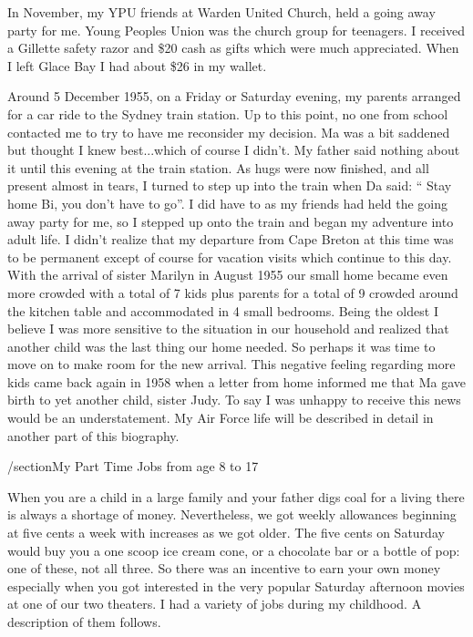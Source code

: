 In November, my YPU friends at Warden United Church, held a going away party for me. Young Peoples Union was the church group for teenagers. I received a Gillette safety razor and \$20 cash as gifts which were much appreciated. When I left Glace Bay I had about \$26 in my wallet.

Around 5 December 1955, on a Friday or Saturday evening, my parents arranged for a car ride to the Sydney train station. Up to this point, no one from school contacted me to try to have me reconsider my decision. Ma was a bit saddened but thought I knew best...which of course I didn't. My father said nothing about it until this evening at the train station. As hugs were now finished, and all present almost in tears, I turned to step up into the train when Da said: “ Stay home Bi, you don't have to go”. I did have to as my friends had held the going away party for me, so I stepped up onto the train and began my adventure into adult life. I didn't realize that my departure from Cape Breton at this time was to be permanent except of course for vacation visits which continue to this day. With the arrival of sister Marilyn in August 1955 our small home became even more crowded with a total of 7 kids plus parents for a total of 9 crowded around the kitchen table and accommodated in 4 small bedrooms. Being the oldest I believe I was more sensitive to the situation in our household and realized that another child was the last thing our home needed. So perhaps it was time to move on to make room for the new arrival. This negative feeling regarding more kids came back again in 1958 when a letter from home informed me that Ma gave birth to yet another child, sister Judy. To say I was unhappy to receive this news would be an understatement.
My Air Force life will be described in detail in another part of this biography.

/section{My Part Time Jobs from age 8 to 17}

When you are a child in a large family and your father digs coal for a living there is always a shortage of money. Nevertheless, we got weekly allowances beginning at five cents a week with increases as we got older. The five cents on Saturday would buy you a one scoop ice cream cone, or a chocolate bar or a bottle of pop: one of these, not all three. So there was an incentive to earn your own money especially when you got interested in the very popular Saturday afternoon movies at one of our two theaters. I had a variety of jobs during my childhood. A description of them follows.

